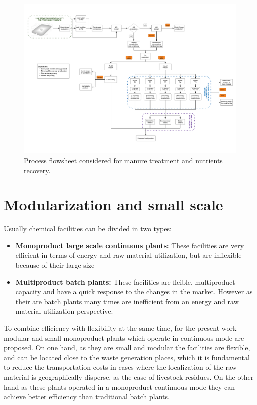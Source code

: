 \documentclass[10pt,a4paper]{article}
\begin{document}
\begin{figure}[H]
	\centering
	\includegraphics[width=\linewidth]{Process_Flowsheet} 
	\caption{Process flowsheet considered for manure treatment and nutrients recovery.}
	\label{fig:flowsheet}
\end{figure}

\section{Modularization and small scale}
Usually chemical facilities can be divided in two types:

\begin{itemize}
	\item \textbf{Monoproduct large scale continuous plants:} These facilities are very efficient in terms of energy and raw material utilization, but are inflexible because of their large size
	\item \textbf{Multiproduct batch plants:} These facilities are fleible, multiproduct capacity and have a quick response to the changes in the market. However as their are batch plants many times are inefficient from an energy and raw material utilization perspective.
\end{itemize}

To combine efficiency with flexibility at the same time, for the present work modular and small monoproduct plants which operate in continuous mode are proposed. On one hand, as they are small and modular the facilities are flexible, and can be located close to the waste generation places, which it is fundamental to reduce the transportation costs in cases where the localization of the raw material is geographically disperse, as the case of livestock residues. On the other hand as these plants operated in a monoproduct continuous mode they can achieve better efficiency than traditional batch plants.
\end{document}
